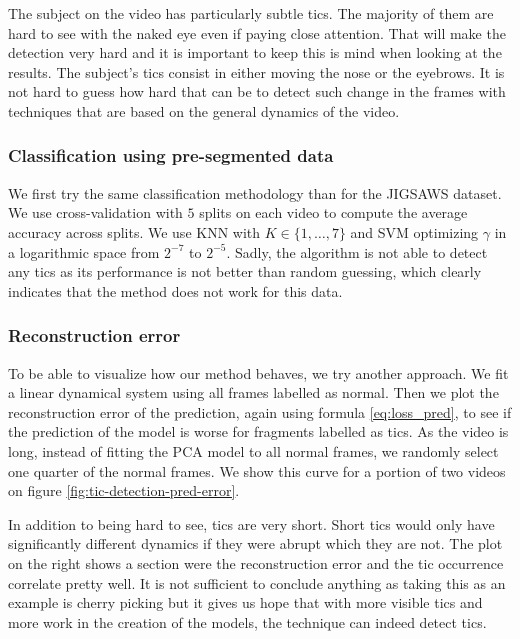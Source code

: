 \documentclass[twocolumn,10pt]{asme2ej}
\begin{document}
The subject on the video has particularly subtle tics. The majority of them are hard to see with the naked eye even if paying close attention. That will make the detection very hard and it is important to keep this is mind when looking at the results. The subject's tics consist in either moving the nose or the eyebrows. It is not hard to guess how hard that can be to detect such change in the frames with techniques that are based on the general dynamics of the video.

\subsubsection{Classification using pre-segmented data}
We first try the same classification methodology than for the JIGSAWS dataset. We use cross-validation with $5$ splits on each video to compute the average accuracy across splits. We use KNN with $K\in \{1,\dots,7\}$ and SVM optimizing $\gamma$ in a logarithmic space from $2^{-7}$ to $2^{-5}$. Sadly, the algorithm is not able to detect any tics as its performance is not better than random guessing, which clearly indicates that the method does not work for this data.

\subsubsection{Reconstruction error}
To be able to visualize how our method behaves, we try another approach. We fit a linear dynamical system using all frames labelled as normal. Then we plot the reconstruction error of the prediction, again using formula \eqref{eq:loss_pred}, to see if the prediction of the model is worse for fragments labelled as tics. As the video is long, instead of fitting the PCA model to all normal frames, we randomly select one quarter of the normal frames. We show this curve for a portion of two videos on figure \ref{fig:tic-detection-pred-error}.

In addition to being hard to see, tics are very short. Short tics would only have significantly different dynamics if they were abrupt which they are not. The plot on the right shows a section were the reconstruction error and the tic occurrence correlate pretty well. It is not sufficient to conclude anything as taking this as an example is cherry picking but it gives us hope that with more visible tics and more work in the creation of the models, the technique can indeed detect tics.

\end{document}
